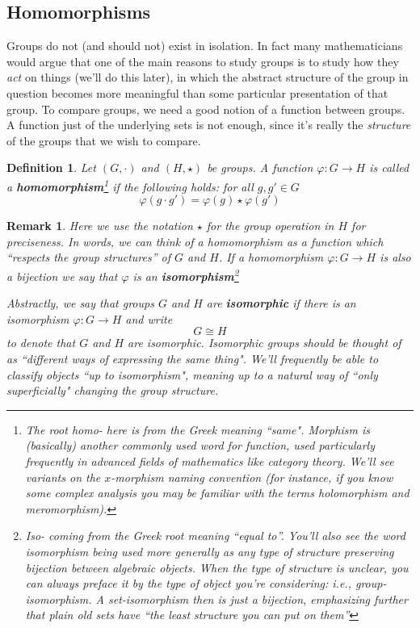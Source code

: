 \documentclass[12pt]{article}
\numberwithin{equation}{subsection}
\newtheorem{defn}[subsection]{Definition}
\theoremstyle{note}
\newtheorem{remark}[subsection]{Remark}
\begin{document}
\subsection{Homomorphisms}
Groups do not (and should not) exist in isolation. In fact many mathematicians would argue that one of the main reasons to study groups is to study how they \textit{act} on things (we'll do this later), in which the abstract structure of the group in question becomes more meaningful than some particular presentation of that group. To compare groups, we need a good notion of a function between groups. A function just of the underlying sets is not enough, since it's really the \textit{structure} of the groups that we wish to compare. 

\begin{defn} Let $(G,\cdot)$ and $(H,\star)$ be groups. A function $\varphi\colon G\to H$ is called a \textbf{homomorphism}\footnote{The root \textit{homo}- here is from the Greek meaning ``same". \textit{Morphism} is (basically) another commonly used word for function, used particularly frequently in advanced fields of mathematics like category theory. We'll see variants on the $x$-morphism naming convention (for instance, if you know some complex analysis you may be familiar with the terms \textit{holomorphism} and \textit{meromorphism}). } if the following holds: for all $g,g'\in G$ \begin{equation} \varphi( g \cdot g')=\varphi(g) \star \varphi(g')\end{equation}
\end{defn}

\begin{remark}Here we use the notation $\star$ for the group operation in $H$ for preciseness. In words, we can think of a homomorphism as a function which ``respects the group structures'' of $G$ and $H$. If a homomorphism $\varphi\colon G\to H$ is also a bijection we say that $\varphi$ is an \textbf{isomorphism}\footnote{\textit{Iso}- coming from the Greek root meaning ``equal to''. You'll also see the word isomorphism being used more generally as any type of structure preserving bijection between algebraic objects. When the type of structure is unclear, you can always preface it by the type of object you're considering: i.e., \textit{group-isomorphism}. A \textit{set-isomorphism} then is just a bijection, emphasizing further that plain old sets have ``the least structure you can put on them''}

Abstractly, we say that groups $G$ and $H$ are \textbf{isomorphic} if there is an isomorphism $\varphi\colon G\to H$ and write \begin{equation} G\cong H \end{equation} to denote that $G$ and $H$ are isomorphic. Isomorphic groups should be thought of as ``different ways of expressing the same thing". We'll frequently be able to classify objects ``up to isomorphism", meaning up to a natural way of ``only superficially" changing the group structure. 
\end{remark}
\end{document}
